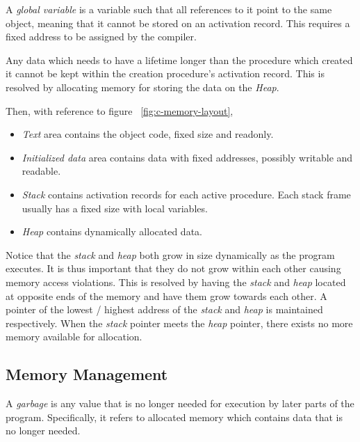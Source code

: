 \begin{definition}
    A \textit{global variable} is a variable such that all references to it point to the same object, meaning that it cannot be stored on an activation record. This requires a fixed address to be assigned by the compiler.
\end{definition}

\begin{definition}
    Any data which needs to have a lifetime longer than the procedure which created it cannot be kept within the creation procedure's activation record. This is resolved by allocating memory for storing the data on the \textit{Heap}.
\end{definition}

\begin{remark}
    Then, with reference to figure ~\ref{fig:c-memory-layout},
    \begin{itemize}
        \item \textit{Text} area contains the object code, fixed size and readonly.
        \item \textit{Initialized data} area contains data with fixed addresses, possibly writable and readable.
        \item \textit{Stack} contains activation records for each active procedure. Each stack frame usually has a fixed size with local variables.
        \item \textit{Heap} contains dynamically allocated data.
    \end{itemize}
    
    Notice that the \textit{stack} and \textit{heap} both grow in size dynamically as the program executes. It is thus important that they do not grow within each other causing memory access violations. This is resolved by having the \textit{stack} and \textit{heap} located at opposite ends of the memory and have them grow towards each other. A pointer of the lowest / highest address of the \textit{stack} and \textit{heap} is maintained respectively. When the \textit{stack} pointer meets the \textit{heap} pointer, there exists no more memory available for allocation.
\end{remark}

\subsection{Memory Management}

\begin{definition}[Garbage]
    A \textit{garbage} is any value that is no longer needed for execution by later parts of the program. Specifically, it refers to allocated memory which contains data that is no longer needed.
\end{definition}

